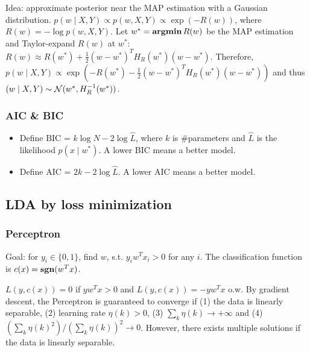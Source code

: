 Idea: approximate posterior near the MAP estimation with a Gaussian distribution.
$p(w\mid X, Y) \propto p(w, X, Y) \propto \exp(-R(w))$, where $R(w) = -\log p(w, X, Y)$. Let $w^* = \operatorname{\textbf{argmin}} R(w)$ be the MAP estimation and Taylor-expand $R(w)$ at $w^*$: $R(w) \approx R(w^*) + \frac{1}{2}(w-w^*)^T H_R(w^*) (w-w^*)$. Therefore, $p(w\mid X,Y)\propto \exp(-R(w^*) -\frac{1}{2}(w-w^*)^T H_R(w^*) (w-w^*))$ and thus $(w\mid X,Y) \sim \mathcal{N}(w^*, H_R^{-1}(w^*))$.

\subsubsection*{AIC \& BIC}

\begin{itemize}
    \item Define BIC = $k\log N -2\log \hat{L}$, where $k$ is \#parameters and $\hat{L}$ is the likelihood $p(x\mid w^*)$. A lower BIC means a better model.
    \item Define AIC = $2k-2\log \hat{L}$. A lower AIC means a better model.
\end{itemize}

\subsection*{LDA by loss minimization}

\subsubsection*{Perceptron}

Goal: for $y_i\in\{0,1\}$, find $w$, s.t. $y_i w^T x_i >0$ for any $i$. The classification function is $c(x) = \operatorname{\textbf{sgn}}(w^T x)$.

$L(y, c(x)) = 0$ if $y w^T x >0$ and $L(y, c(x)) = -y w^T x$ o.w. By gradient descent, the Perceptron is guaranteed to converge if (1) the data is linearly separable, (2) learning rate $\eta(k)>0$, (3) $\sum_k \eta(k) \rightarrow +\infty$ and (4) $(\sum_k \eta(k)^2)/(\sum_k \eta(k))^2 \rightarrow 0$. However, there exists multiple solutions if the data is linearly separable.


